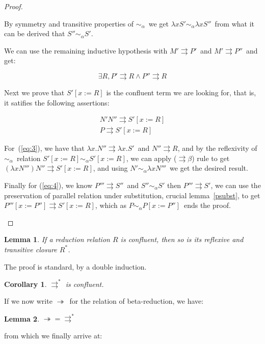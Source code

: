 \documentclass[preprint,10pt]{sigplanconf}
\newcommand{\breds}{\ensuremath{\twoheadrightarrow}}
\newcommand{\lam}{\ensuremath{\lambda}}
\newcommand{\alpsym}{\ensuremath{\sim_\alpha}}
\newcommand{\p}{\ensuremath{\rightrightarrows}}
\newtheorem{lemma}{Lemma}
\newtheorem{coro}{Corollary}
\begin{document}
\begin{proof}
\begin{itemize}
          By symmetry and transitive properties of \alpsym\ we get $\lam x S' \alpsym \lam x S''$\ from what it can be derived that $S'' \alpsym S'$.
          
          We can use the remaining inductive hypothesis with $M' \p P'$\ and $M' \p P''$\ and get:

          \begin{equation*}
            \exists R, P' \p R \wedge P'' \p R
          \end{equation*}

          Next we prove that $S' [x:=R]$ is the confluent term we are looking for, that is, it satifies the following assertions:

          \begin{align}
            \label{eq:3}
            N' N'' \p S' [x:=R] \\
            \label{eq:4}
             P \p S' [x:=R]
          \end{align}

          For~(\ref{eq:3}),  we have that $\lam x . N'' \p \lam x . S' $\ and $N'' \p R$, and by the reflexivity of \alpsym\ relation $S'[x:=R] \alpsym S'[x:=R]$, we can apply ($\p\beta$) rule to get $(\lam x N''') N'' \p S' [x:=R]$, and using $N' \alpsym \lam x N'''$\ we get the desired result.

          Finally for (\ref{eq:4}), we know $P''' \p S''$\ and $S'' \alpsym S'$ then $P''' \p S'$, we can use the preservation of parallel relation under substitution, crucial lemma~\ref{psubst}, to get $P'''[x:=P''] \p S'[x:=R]$, which as $P \alpsym P[x:=P'']$\ ends the proof.
    \end{itemize}
  \end{proof}


\begin{lemma}
If a reduction relation $R$ is confluent, then so is its reflexive and transitive closure $R^*$.
\end{lemma}

The proof is standard, by a double induction.

\begin{coro}
$\p^*$ is confluent.
\end{coro}

If we now write \breds\ for the relation of beta-reduction, we have:

\begin{lemma} $ \breds = \p^* $
\end{lemma}

\noindent from which we finally arrive at:
\end{document}
